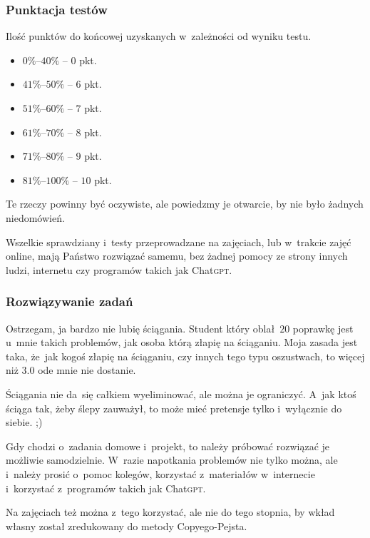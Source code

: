 \documentclass[10pt,t]{beamer}
\begin{document}
\begin{frame}
  \frametitle{Punktacja testów}


  Ilość punktów do końcowej uzyskanych w~zależności od wyniku testu.

  \begin{itemize}

  \item $0\%\text{--}40\%$ -- $0$ pkt.

  \item $41\%\text{--}50\%$ -- $6$ pkt.

  \item $51\%\text{--}60\%$ -- $7$ pkt.

  \item $61\%\text{--}70\%$ -- $8$ pkt.

  \item $71\%\text{--}80\%$ -- $9$ pkt.

  \item $81\%\text{--}100\%$ -- $10$ pkt.

  \end{itemize}





  Te rzeczy powinny być oczywiste, ale powiedzmy je otwarcie, by nie było
  żadnych niedomówień.

  Wszelkie sprawdziany i~testy przeprowadzane na zajęciach, lub w~trakcie
  zajęć online, mają Państwo rozwiązać \alert{samemu}, bez żadnej pomocy
  ze strony innych ludzi, internetu czy programów takich jak
  Chat\textsc{gpt}.

\end{frame}





\begin{frame}
  \frametitle{Rozwiązywanie zadań}


  Ostrzegam, ja bardzo \alert{nie lubię} ściągania. Student który
  oblał~$20$ poprawkę jest u~mnie takich problemów, jak osoba
  którą złapię na ściąganiu. Moja zasada jest taka, że~jak kogoś złapię na
  ściąganiu, czy innych tego typu oszustwach, to więcej niż $3.0$ ode mnie
  \alert{nie dostanie}.

  Ściągania nie da~się całkiem wyeliminować, ale można je ograniczyć.
  A~jak ktoś ściąga tak, żeby ślepy zauważył, to może mieć pretensje tylko
  i~wyłącznie do siebie. ;)

  Gdy chodzi o~zadania domowe i~projekt, to należy próbować rozwiązać je
  możliwie samodzielnie. W~razie napotkania problemów nie tylko można,
  ale i~należy prosić o~pomoc kolegów, korzystać z~materiałów w~internecie
  i~korzystać z~programów takich jak Chat\textsc{gpt}.

  Na zajęciach też można z~tego korzystać, ale nie do tego stopnia, by
  wkład własny został zredukowany do metody Copyego-Pejsta.

\end{frame}
\end{document}

